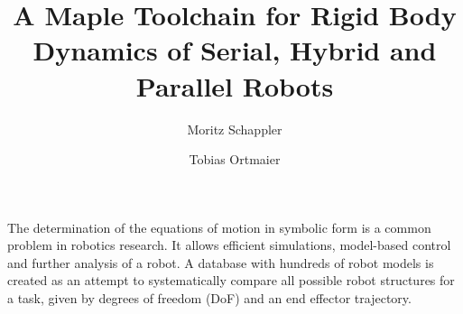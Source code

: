\documentclass[runningheads]{llncs}
\begin{document}
%
\title{A Maple Toolchain for Rigid Body Dynamics of Serial, Hybrid and Parallel Robots}%
%
%
\author{Moritz Schappler \and
Tobias Ortmaier}%

%
%
%
\maketitle              %
%


The determination of the equations of motion in symbolic form is a common problem in robotics research.
It allows efficient simulations, model-based control and further analysis of a robot.
A database with hundreds of robot models is created as an attempt to systematically compare all possible robot structures for a task, given by degrees of freedom (DoF) and an end effector trajectory.
\end{document}
